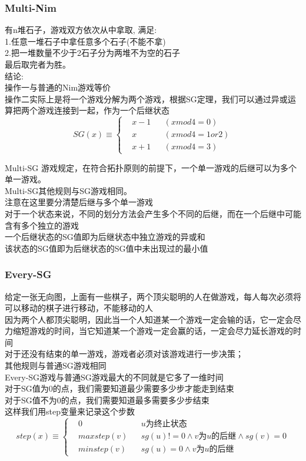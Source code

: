 \documentclass[10pt]{ctexart}
\begin{document}
{{\subsubsection{Multi-Nim}
有n堆石子，游戏双方依次从中拿取, 满足:\\
1.任意一堆石子中拿任意多个石子(不能不拿)\\
2.把一堆数量不少于2石子分为两堆不为空的石子\\
最后取完者为胜。\\
结论:\\
操作一与普通的Nim游戏等价\\
操作二实际上是将一个游戏分解为两个游戏，根据SG定理，我们可以通过异或运算把两个游戏连接到一起，作为一个后继状态\\
\begin{equation}
    SG(x)\equiv\left\{
    \begin{aligned}
    &x-1 & & (x mod 4 = 0) \\
    &x   & & (x mod 4 = 1 or 2)  \\
    &x+1 & & (x mod 4 = 3)
    \end{aligned}
    \right.
\end{equation}
\par
Multi-SG 游戏规定，在符合拓扑原则的前提下，一个单一游戏的后继可以为多个单一游戏。\\
Multi-SG其他规则与SG游戏相同。\\
注意在这里要分清楚后继与多个单一游戏\\
对于一个状态来说，不同的划分方法会产生多个不同的后继，而在一个后继中可能含有多个独立的游戏\\
一个后继状态的SG值即为后继状态中独立游戏的异或和\\
该状态的SG值即为后继状态的SG值中未出现过的最小值\\
\subsubsection{Every-SG}
给定一张无向图，上面有一些棋子，两个顶尖聪明的人在做游戏，每人每次必须将可以移动的棋子进行移动，不能移动的人\\
因为两个人都顶尖聪明，因此当一个人知道某一个游戏一定会输的话，它一定会尽力缩短游戏的时间，当它知道某一个游戏一定会赢的话，一定会尽力延长游戏的时间\\
对于还没有结束的单一游戏，游戏者必须对该游戏进行一步决策；\\
其他规则与普通SG游戏相同\\
Every-SG游戏与普通SG游戏最大的不同就是它多了一维时间\\
对于SG值为0的点，我们需要知道最少需要多少步才能走到结束\\
对于SG值不为0的点，我们需要知道最多需要多少步结束\\
这样我们用step变量来记录这个步数\\
\begin{equation}
    step(x)\equiv\left\{
    \begin{aligned}
    &0            & & u为终止状态 \\
    &max{step(v)} & & sg(u)!=0∧v为u的后继∧sg(v)=0\\
    &min{step(v)} & & sg(u)=0∧v为u的后继
    \end{aligned}
    \right.
\end{equation}
}}
\end{document}
